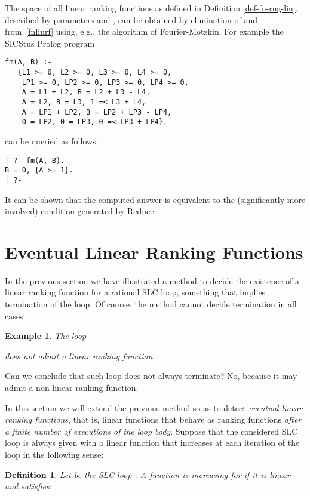 \documentclass{acm_proc_article-sp}
\newtheorem{definition}[theorem]{Definition}
\newtheorem{example}[theorem]{Example}
\begin{document}
The space of all linear ranking functions as defined in Definition \ref{def-fn-rng-lin},
described by parameters  and ,
can be obtained by elimination of  and 
from~\eqref{fnlinrf} using, e.g., the algorithm of Fourier-Motzkin.
For example the SICStus Prolog program
\begin{verbatim}
fm(A, B) :-
   {L1 >= 0, L2 >= 0, L3 >= 0, L4 >= 0,
    LP1 >= 0, LP2 >= 0, LP3 >= 0, LP4 >= 0,
    A = L1 + L2, B = L2 + L3 - L4,
    A = L2, B = L3, 1 =< L3 + L4,
    A = LP1 + LP2, B = LP2 + LP3 - LP4,
    0 = LP2, 0 = LP3, 0 =< LP3 + LP4}.
\end{verbatim}
can be queried as follows:
\begin{verbatim}
| ?- fm(A, B).
B = 0, {A >= 1}.
| ?-
\end{verbatim}
It can be shown that the computed answer is equivalent to the
(significantly more involved) condition generated by Reduce.


\section{Eventual Linear Ranking Functions}
\label{sec:eventual-linear-ranking-functions}

In the previous section we have illustrated a method to decide
the existence of a linear ranking function for a rational SLC loop,
something that implies termination of the loop.
Of course, the method cannot decide termination in all cases.

\begin{example}
\label{ex-fn-rng-lin-evt-p}
The loop

does not admit a linear ranking function.
\end{example}

Can we conclude that such loop does not always terminate?
No, because it may admit a non-linear ranking function.

In this section we will extend the previous method so as to detect
\emph{eventual linear ranking functions}, that is, linear functions
that behave as ranking functions
\emph{after a finite number of executions of the loop body}.
Suppose that the considered SLC loop is always given with
a linear function  that increases at each
iteration of the loop in the following sense:

\begin{definition}
\label{def-inc-lin-fn}
Let  be the SLC loop
 .
A function  is \emph{increasing for }
if it is linear and satisfies:

\end{definition}
\end{document}
